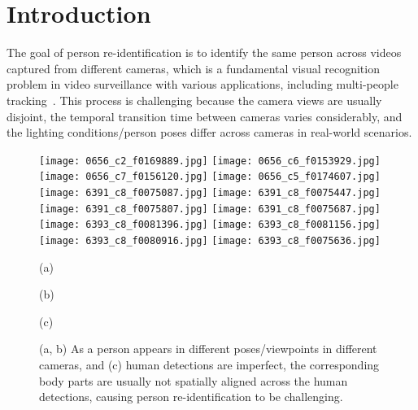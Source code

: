 \documentclass{llncs}
\begin{document}
\section{Introduction}
\label{sec:introduction}
The goal of person re-identification is to identify the same person across videos captured from different cameras, which is a fundamental visual recognition problem in video surveillance with various applications, including multi-people tracking~\cite{TangAAS17}. This process is challenging because the camera views are usually disjoint, the temporal transition time between cameras varies considerably, and the lighting conditions/person poses differ across cameras in real-world scenarios.

\begin{figure}[t]
\centering
    \begin{minipage}{0.99\linewidth}
\centering
      \texttt{[image: 0656\_c2\_f0169889.jpg]}
      \texttt{[image: 0656\_c6\_f0153929.jpg]}
      \texttt{[image: 0656\_c7\_f0156120.jpg]}
      \texttt{[image: 0656\_c5\_f0174607.jpg]}
\texttt{[image: 6391\_c8\_f0075087.jpg]}
      \texttt{[image: 6391\_c8\_f0075447.jpg]}
      \texttt{[image: 6391\_c8\_f0075807.jpg]}
      \texttt{[image: 6391\_c8\_f0075687.jpg]}
\texttt{[image: 6393\_c8\_f0081396.jpg]}
      \texttt{[image: 6393\_c8\_f0081156.jpg]}
      \texttt{[image: 6393\_c8\_f0080916.jpg]}
      \texttt{[image: 6393\_c8\_f0075636.jpg]}
    \end{minipage}

    \begin{minipage}{0.99\linewidth}
    \begin{minipage}{0.33\linewidth}
\centering
      \small{(a)}
    \end{minipage}
    \begin{minipage}{0.33\linewidth}
\centering
      \small{(b)}
    \end{minipage}
    \begin{minipage}{0.33\linewidth}
\centering
      \small{(c)}
    \end{minipage}
    \end{minipage}
\vspace{-.3cm}

\caption{(a, b) As a person appears in different poses/viewpoints in different cameras, and (c) human detections are imperfect, the corresponding body parts are usually not spatially aligned across the human detections, causing person re-identification to be challenging.}
\label{fig:main}
\end{figure}
\end{document}
